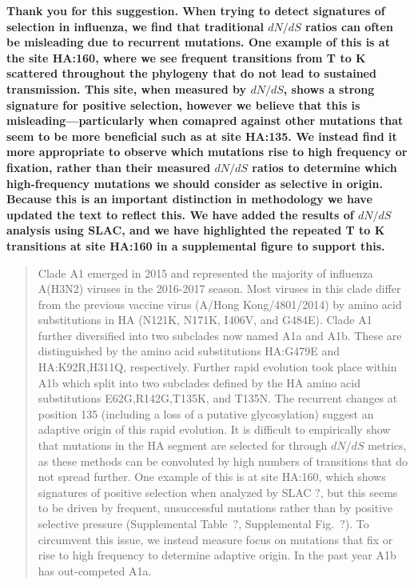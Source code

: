 \documentclass[11pt,oneside,letterpaper]{article}
\begin{document}
\textbf{Thank you for this suggestion. When trying to detect signatures of selection in influenza, we find that traditional $dN/dS$ ratios can often be misleading due to recurrent mutations. One example of this is at the site HA:160, where we see frequent transitions from T to K scattered throughout the phylogeny that do not lead to sustained transmission. This site, when measured by $dN/dS$, shows a strong signature for positive selection, however we believe that this is misleading---particularly when comapred against other mutations that seem to be more beneficial such as at site HA:135. We instead find it more appropriate to observe which mutations rise to high frequency or fixation, rather than their measured $dN/dS$ ratios to determine which high-frequency mutations we should consider as selective in origin. Because this is an important distinction in methodology we have updated the text to reflect this. We have added the results of $dN/dS$ analysis using SLAC, and we have highlighted the repeated T to K transitions at site HA:160 in a supplemental figure to support this.}

\begin{quotation}
  Clade A1 emerged in 2015 and represented the majority of influenza A(H3N2) viruses in the 2016-2017 season.
  Most viruses in this clade differ from the previous vaccine virus (A/Hong Kong/4801/2014) by amino acid substitutions in HA (N121K, N171K, I406V, and G484E).
  Clade A1 further diversified into two subclades now named A1a and A1b.
  These are distinguished by the amino acid substitutions HA:G479E and HA:K92R,H311Q, respectively.
  Further rapid evolution took place within A1b which split into two subclades defined by the HA amino acid substitutions E62G,R142G,T135K, and T135N.
  The recurrent changes at position 135 (including a loss of a putative glycosylation) suggest an adaptive origin of this rapid evolution.
  It is difficult to empirically show that mutations in the HA segment are selected for through $dN/dS$ metrics, as these methods can be convoluted by high numbers of transitions that do not spread further.
  One example of this is at site HA:160, which shows signatures of positive selection when analyzed by SLAC $?$, but this seems to be driven by frequent, unsuccessful mutations rather than by positive selective pressure (Supplemental Table~$?$, Supplemental Fig.~$?$).
  To circumvent this issue, we instead measure focus on mutations that fix or rise to high frequency to determine adaptive origin.
  In the past year A1b has out-competed A1a.
\end{quotation}
\end{document}
